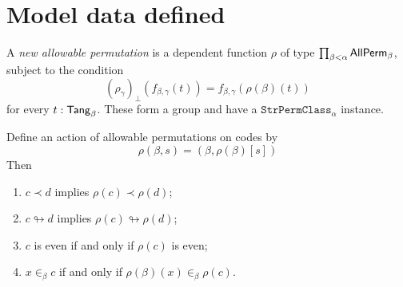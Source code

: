 \section{Model data defined}
\begin{definition}
  \label{def:NewAllPerm}
  A \emph{new allowable permutation} is a dependent function \( \rho \) of type \( \prod_{\beta < \alpha} \mathsf{AllPerm}_\beta \), subject to the condition
  \[ (\rho_\gamma)_\bot(f_{\beta,\gamma}(t)) = f_{\beta,\gamma}(\rho(\beta)(t)) \]
  for every \( t : \mathsf{Tang}_\beta \).
  These form a group and have a \( \texttt{StrPermClass}_\alpha \) instance.
\end{definition}
\begin{proposition}
  \label{prop:AllPerm.smul_cloud_smul}
  Define an action of allowable permutations on codes by
  \[ \rho(\beta, s) = (\beta, \rho(\beta)[s]) \]
  Then
  \begin{enumerate}
    \item \( c \prec d \) implies \( \rho(c) \prec \rho(d) \);
    \item \( c \looparrowright d \) implies \( \rho(c) \looparrowright \rho(d) \);
    \item \( c \) is even if and only if \( \rho(c) \) is even;
    \item \( x \in_\beta c \) if and only if \( \rho(\beta)(x) \in_\beta \rho(c) \).
  \end{enumerate}
\end{proposition}
